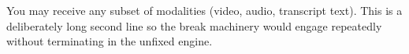 \documentclass{article}
\begin{document}
\begin{Prompt}
You may receive any subset of modalities (video, audio, transcript text).
This is a deliberately long second line so the break machinery would engage repeatedly without terminating in the unfixed engine.
\end{Prompt}
\end{document}
